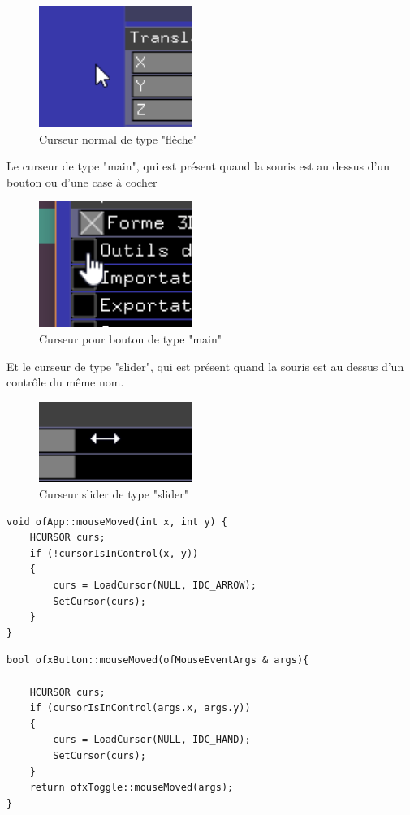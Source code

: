 \begin{figure}[h]
	\centering
	\includegraphics[width=5cm]{fig/curseurNormal.png}
	\caption{Curseur normal de type "flèche"}
	\label{fig:test}
\end{figure}

Le curseur de type "main", qui est présent quand la souris est au dessus d'un bouton ou d'une case à cocher

\begin{figure}[h]
	\centering
	\includegraphics[width=5cm]{fig/curseurBouton.png}
	\caption{Curseur pour bouton de type "main"}
	\label{fig:test}
\end{figure}

Et le curseur de type "slider", qui est présent quand la souris est au dessus d'un contrôle du même nom.

\begin{figure}[h]
	\centering
	\includegraphics[width=5cm]{fig/curseurSlider.png}
	\caption{Curseur slider de type "slider"}
	\label{fig:test}
\end{figure}

\begin{lstlisting}
void ofApp::mouseMoved(int x, int y) {
	HCURSOR curs;
	if (!cursorIsInControl(x, y))
	{
		curs = LoadCursor(NULL, IDC_ARROW);
		SetCursor(curs);
	}
}
\end{lstlisting}

\begin{lstlisting}
bool ofxButton::mouseMoved(ofMouseEventArgs & args){

	HCURSOR curs;
	if (cursorIsInControl(args.x, args.y))
	{
		curs = LoadCursor(NULL, IDC_HAND);
		SetCursor(curs);
	}
	return ofxToggle::mouseMoved(args);
}
\end{lstlisting}


